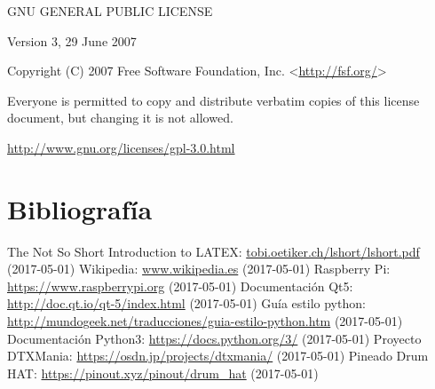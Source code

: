 \documentclass[a4paper,11pt,oneside]{book}
\begin{document}
\begin{center}
GNU GENERAL PUBLIC LICENSE
\end{center}
            
\begin{center}
Version 3, 29 June 2007
\end{center}


 \begin{center}
 Copyright (C) 2007 Free Software Foundation, Inc. <\url{http://fsf.org/}>
 \end{center}

 Everyone is permitted to copy and distribute verbatim copies of this license document, but changing it is not allowed.


\url{http://www.gnu.org/licenses/gpl-3.0.html}



\printnoidxglossaries

\chapter {Bibliografía}
\begin{thebibliography}{99}
 The Not So Short Introduction to LATEX: \url{tobi.oetiker.ch/lshort/lshort.pdf} 
(2017-05-01)
 Wikipedia: \url{www.wikipedia.es} (2017-05-01)
 Raspberry Pi: \url{https://www.raspberrypi.org} (2017-05-01)
 Documentación Qt5: \url{http://doc.qt.io/qt-5/index.html} (2017-05-01)
 Guía estilo python: \url{http://mundogeek.net/traducciones/guia-estilo-python.htm} 
(2017-05-01)
 Documentación Python3: \url{https://docs.python.org/3/} (2017-05-01)
 Proyecto DTXMania: \url{https://osdn.jp/projects/dtxmania/} (2017-05-01)
 Pineado Drum HAT: \url{https://pinout.xyz/pinout/drum_hat} (2017-05-01)
\end{thebibliography}
\end{document}

